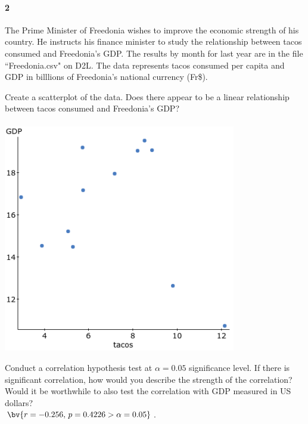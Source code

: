\documentclass{article}
\begin{document}
\begin{flushleft}
\paragraph{2} The Prime Minister of Freedonia wishes to improve the economic strength of his country. He instructs his finance minister to study the relationship between tacos consumed and Freedonia's GDP. The results by month for last year are in the file ``Freedonia.csv" on D2L. The data represents tacos consumed per capita and GDP in billlions of Freedonia's national currency (Fr\$).
\begin{enumalpha}
\item Create a scatterplot of the data. Does there appear to be a linear relationship between tacos consumed and Freedonia's GDP?\\
\medskip
{}\\
\medskip
\includegraphics[width=4in]{images/grp10_Q2_a}
\vspace{.5in}
\item Conduct a correlation hypothesis test at $\alpha = 0.05$ significance level. If there is significant correlation, how would you describe the strength of the correlation? Would it be worthwhile to also test the correlation with GDP measured in US dollars?\\
\medskip
$\bv{r = -0.256, \, p = 0.4226 > \alpha = 0.05}$. 

\end{enumalpha}
\end{flushleft}
\end{document}
